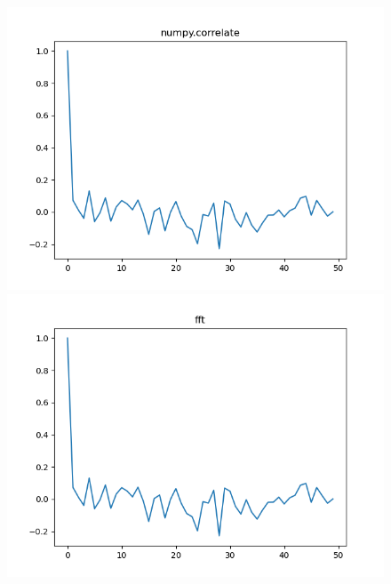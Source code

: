 \documentclass[10pt, onecolumn]{article}
\begin{document}
\begin{enumerate}
		\begin{figure}[h!]
\centering
\begin{minipage}{.5\textwidth}
  \centering
  \includegraphics[scale=0.5]{figs/numpy_correlate.png}
	\caption{}
  \label{fig:numpy_correlate}
\end{minipage}%
\begin{minipage}{.5\textwidth}
  \centering
  \includegraphics[scale=0.5]{figs/fourier.png}
	\caption{}
  \label{fig:fft}
\end{minipage}
\end{figure}


\end{enumerate}
\end{document}
